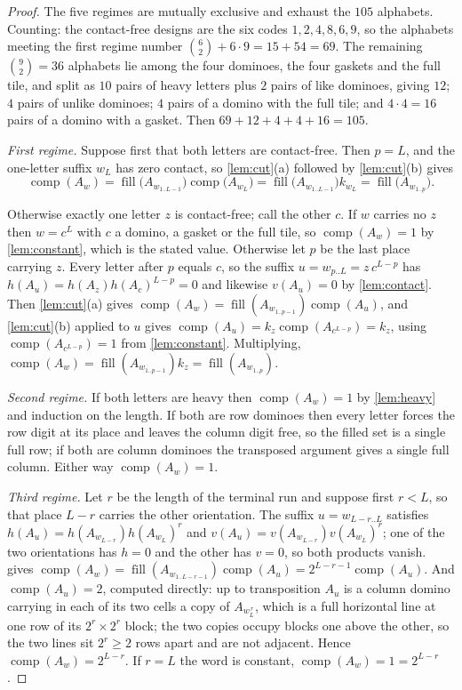 \documentclass[11pt]{amsart}
\theoremstyle{definition}
\theoremstyle{remark}
\DeclareMathOperator{\comp}{comp}
\DeclareMathOperator{\fil}{fill}
\begin{document}
\begin{proof}
The five regimes are mutually exclusive and exhaust the $105$ alphabets. Counting: the contact-free designs are the six codes $1,2,4,8,6,9$, so the alphabets meeting the first regime number $\binom{6}{2} + 6 \cdot 9 = 15 + 54 = 69$. The remaining $\binom{9}{2} = 36$ alphabets lie among the four dominoes, the four gaskets and the full tile, and split as $10$ pairs of heavy letters plus $2$ pairs of like dominoes, giving $12$; $4$ pairs of unlike dominoes; $4$ pairs of a domino with the full tile; and $4 \cdot 4 = 16$ pairs of a domino with a gasket. Then $69 + 12 + 4 + 4 + 16 = 105$.

\emph{First regime.} Suppose first that both letters are contact-free. Then $p = L$, and the one-letter suffix $w_L$ has zero contact, so \cref{lem:cut}(a) followed by \cref{lem:cut}(b) gives
\[
\comp(A_w) = \fil\bigl(A_{w_{1..L-1}}\bigr) \comp\bigl(A_{w_L}\bigr) = \fil\bigl(A_{w_{1..L-1}}\bigr) k_{w_L} = \fil\bigl(A_{w_{1..p}}\bigr).
\]

Otherwise exactly one letter $z$ is contact-free; call the other $c$. If $w$ carries no $z$ then $w = c^L$ with $c$ a domino, a gasket or the full tile, so $\comp(A_w) = 1$ by \cref{lem:constant}, which is the stated value. Otherwise let $p$ be the last place carrying $z$. Every letter after $p$ equals $c$, so the suffix $u = w_{p..L} = z\,c^{L-p}$ has $h(A_u) = h(A_z) h(A_c)^{L-p} = 0$ and likewise $v(A_u) = 0$ by \cref{lem:contact}. Then \cref{lem:cut}(a) gives $\comp(A_w) = \fil(A_{w_{1..p-1}}) \comp(A_u)$, and \cref{lem:cut}(b) applied to $u$ gives $\comp(A_u) = k_z \comp(A_{c^{L-p}}) = k_z$, using $\comp(A_{c^{L-p}}) = 1$ from \cref{lem:constant}. Multiplying, $\comp(A_w) = \fil(A_{w_{1..p-1}}) k_z = \fil(A_{w_{1..p}})$.

\emph{Second regime.} If both letters are heavy then $\comp(A_w) = 1$ by \cref{lem:heavy} and induction on the length. If both are row dominoes then every letter forces the row digit at its place and leaves the column digit free, so the filled set is a single full row; if both are column dominoes the transposed argument gives a single full column. Either way $\comp(A_w) = 1$.

\emph{Third regime.} Let $r$ be the length of the terminal run and suppose first $r < L$, so that place $L-r$ carries the other orientation. The suffix $u = w_{L-r..L}$ satisfies $h(A_u) = h(A_{w_{L-r}}) h(A_{w_L})^{r}$ and $v(A_u) = v(A_{w_{L-r}}) v(A_{w_L})^{r}$; one of the two orientations has $h = 0$ and the other has $v = 0$, so both products vanish.  gives $\comp(A_w) = \fil(A_{w_{1..L-r-1}}) \comp(A_u) = 2^{L-r-1}\comp(A_u)$. And $\comp(A_u) = 2$, computed directly: up to transposition $A_u$ is a column domino carrying in each of its two cells a copy of $A_{w_L^{\,r}}$, which is a full horizontal line at one row of its $2^r \times 2^r$ block; the two copies occupy blocks one above the other, so the two lines sit $2^r \ge 2$ rows apart and are not adjacent. Hence $\comp(A_w) = 2^{L-r}$. If $r = L$ the word is constant, $\comp(A_w) = 1 = 2^{L-r}$.


\end{proof}
\end{document}
